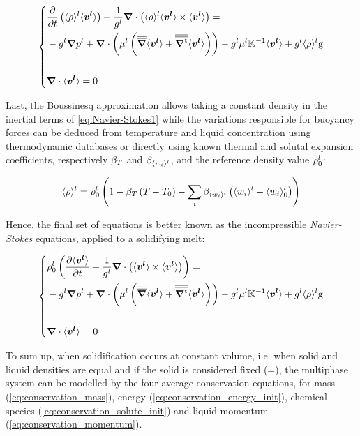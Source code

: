 \begin{equation}
\label{eq:Navier-Stokes1}
   \left\{
   \begin{aligned}
      & \temp{ \rhol \vit } + \frac{1}{\gl} \nabvec \cdot \brac{\rhol \vit \times \vit} = \\
	  &- \gl\nabvec \pl + \nabvec \cdot \brac{\mul  \brac{\nabmat \vit + \nabmattransp \vit}}
	  - \gl \mul \K^{-1} \vit + \gl \rhol \gravity\\ \\
      & \nabvec \cdot \vit =0
    \end{aligned}
    \right.
\end{equation}

Last, the Boussinesq approximation allows taking a constant density in the inertial terms of \cref{eq:Navier-Stokes1} 
while the variations responsible for buoyancy forces can be deduced from temperature and liquid concentration using thermodynamic
databases or directly using known thermal and solutal expansion coefficients, respectively $\beta_T$ and $\beta_{\langle w_i \rangle^l}$, and the reference density value $\rho_{0}^{l}$:

\begin{equation}
\label{eq:rholiq}
 \rhol = \rholref \brac{ 1- \betaT \brac{T-\Tref} - \sum_{i} \betawil \brac{\wil-\wilref}}
\end{equation}

Hence, the final 
set of equations is better known as the incompressible \emph{Navier-Stokes} 
equations, applied to a solidifying melt:

\begin{equation}
\label{eq:conservation_momentum}
   \left\{
   \begin{aligned}
      & \rholref \brac{\tempup{ \vit } + \frac{1}{\gl} \nabvec \cdot \brac{\vit \times \vit}} = \\
	  &- \gl\nabvec \pl + \nabvec \cdot \brac{\mul \brac{\nabmat \vit + \nabmattransp \vit}}
	  - \gl \mul \K^{-1} \vit + \gl \rhol \gravity\\ \\
      & \nabvec \cdot \vit =0
    \end{aligned}
    \right.
\end{equation}


To sum up, when solidification occurs at constant volume, i.e. when solid and liquid densities are equal and if the solid is considered fixed (\vs =),
the multiphase system can be modelled by the four average conservation equations, for mass (\cref{eq:conservation_mass}), energy (\cref{eq:conservation_energy_init}), 
chemical species (\cref{eq:conservation_solute_init}) and liquid momentum (\cref{eq:conservation_momentum}).


